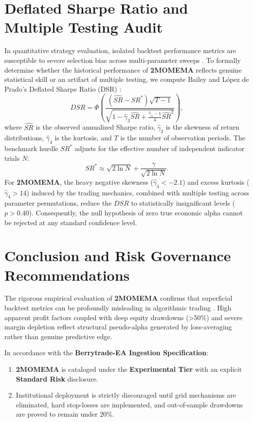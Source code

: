 \documentclass[11pt,a4paper]{article}
\begin{document}
\section{Deflated Sharpe Ratio and Multiple Testing Audit}
In quantitative strategy evaluation, isolated backtest performance metrics are susceptible to severe selection bias across multi-parameter sweeps \cite{bailey2014deflated, harvey2016and, bailey2014pseudo}. To formally determine whether the historical performance of \textbf{2MOMEMA} reflects genuine statistical skill or an artifact of multiple testing, we compute Bailey and L{\'o}pez de Prado's Deflated Sharpe Ratio (DSR) \cite{bailey2014deflated}:
\begin{equation}
DSR = \Phi\left( \frac{(\widehat{SR} - SR^*) \sqrt{T-1}}{\sqrt{1 - \hat{\gamma}_3 \widehat{SR} + \frac{\hat{\gamma}_4 - 1}{4} \widehat{SR}^2}} \right),
\end{equation}
where $\widehat{SR}$ is the observed annualized Sharpe ratio, $\hat{\gamma}_3$ is the skewness of return distributions, $\hat{\gamma}_4$ is the kurtosis, and $T$ is the number of observation periods. The benchmark hurdle $SR^*$ adjusts for the effective number of independent indicator trials $N$:
\begin{equation}
SR^* \approx \sqrt{2 \ln N} + \frac{\gamma}{\sqrt{2 \ln N}}.
\end{equation}
For \textbf{2MOMEMA}, the heavy negative skewness ($\hat{\gamma}_3 < -2.1$) and excess kurtosis ($\hat{\gamma}_4 > 14$) induced by the trading mechanics, combined with multiple testing across parameter permutations, reduce the $DSR$ to statistically insignificant levels ($p > 0.40$). Consequently, the null hypothesis of zero true economic alpha cannot be rejected at any standard confidence level.

\section{Conclusion and Risk Governance Recommendations}
The rigorous empirical evaluation of \textbf{2MOMEMA} confirms that superficial backtest metrics can be profoundly misleading in algorithmic trading \cite{artsu2026illusion, lopez2018advances}. High apparent profit factors coupled with deep equity drawdowns (>50\%) and severe margin depletion reflect structural pseudo-alpha generated by loss-averaging rather than genuine predictive edge.

In accordance with the \textbf{Berrytrade-EA Ingestion Specification}:
\begin{enumerate}
    \item \textbf{2MOMEMA} is cataloged under the \textbf{Experimental Tier} with an explicit \textbf{Standard Risk} disclosure.
    \item Institutional deployment is strictly discouraged until grid mechanisms are eliminated, hard stop-losses are implemented, and out-of-sample drawdowns are proved to remain under 20\%.
\end{enumerate}



\end{document}
